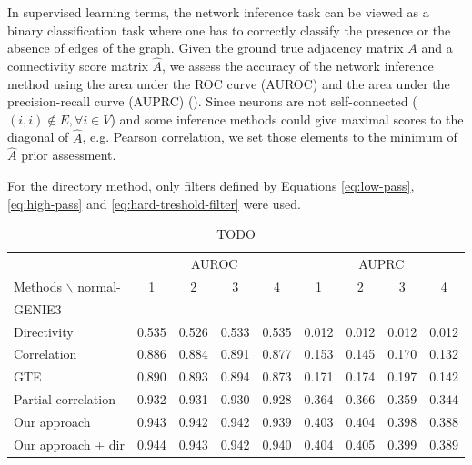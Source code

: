 \documentclass[wcp]{jmlr}
\begin{document}
In supervised learning terms, the network inference task can be viewed as a
binary classification task where one has to correctly classify the presence
or the absence of edges of the graph. Given the ground true adjacency matrix
$A$ and a connectivity score matrix $\hat{A}$, we assess the accuracy of the
network inference method using the area under the ROC curve (AUROC)
and the area under the precision-recall curve (AUPRC)
(\cite{schrynemackers2013protocols}). Since neurons are not self-connected
($(i, i) \not \in E, \forall i \in V$) and some inference methods could
give maximal scores to the diagonal of $\hat{A}$, e.g. Pearson
correlation, we set those elements to the minimum of $\hat{A}$ prior
assessment.



For the directory method, only filters defined by Equations
\ref{eq:low-pass}, \ref{eq:high-pass} and \ref{eq:hard-treshold-filter} were
used.

\begin{table}[tbh]
\centering
\caption{TODO}
\begin{tabular}{@{}l *{8}{c}@{}}
\toprule
  & \multicolumn{4}{c}{AUROC} & \multicolumn{4}{c}{AUPRC} \\
\cmidrule(r){2-5}\cmidrule(r){6-9}
Methods $\backslash$ normal- & 1 & 2 & 3 & 4 & 1 & 2 & 3 & 4 \\
\midrule
GENIE3                 & & & & & & & & \\
Directivity            & 0.535 & 0.526 & 0.533 & 0.535 & 0.012 & 0.012 & 0.012 & 0.012 \\
Correlation            & 0.886 & 0.884 & 0.891 & 0.877 & 0.153 & 0.145 & 0.170 & 0.132 \\
GTE                    & 0.890 & 0.893 & 0.894 & 0.873 & 0.171 & 0.174 & 0.197 & 0.142 \\
Partial correlation    & 0.932 & 0.931 & 0.930 & 0.928 & 0.364 & 0.366 & 0.359 & 0.344 \\
Our approach           & 0.943 & 0.942 & 0.942 & 0.939 & 0.403 & 0.404 & 0.398 & 0.388 \\
Our approach + dir     & 0.944 & 0.943 & 0.942 & 0.940 & 0.404 & 0.405 & 0.399 & 0.389 \\
\bottomrule
\end{tabular}
\end{table}
\end{document}
